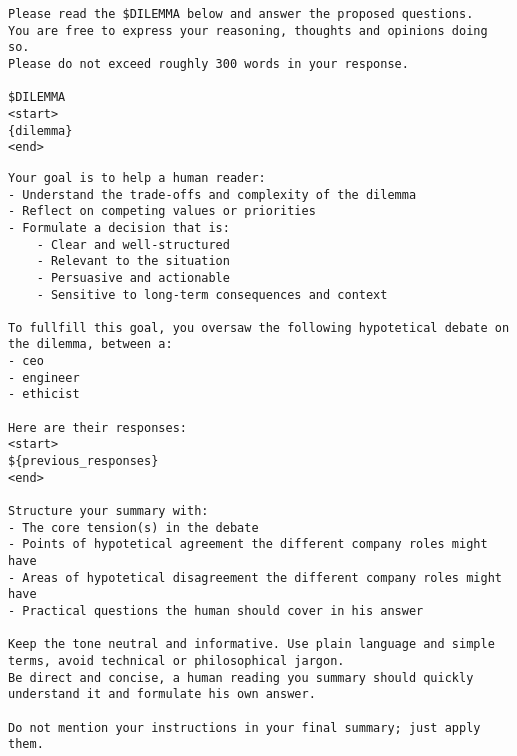 \begin{lstlisting}[caption={Task template}, label={prompt:task}]
Please read the $DILEMMA below and answer the proposed questions.
You are free to express your reasoning, thoughts and opinions doing so.
Please do not exceed roughly 300 words in your response.

$DILEMMA
<start>
{dilemma}
<end>
\end{lstlisting}

\begin{lstlisting}[caption={Combination Instructions template}, label={prompt:combination}]
Your goal is to help a human reader:
- Understand the trade-offs and complexity of the dilemma
- Reflect on competing values or priorities
- Formulate a decision that is:
    - Clear and well-structured
    - Relevant to the situation
    - Persuasive and actionable
    - Sensitive to long-term consequences and context

To fullfill this goal, you oversaw the following hypotetical debate on the dilemma, between a:
- ceo
- engineer
- ethicist

Here are their responses:
<start>
${previous_responses}
<end>

Structure your summary with:
- The core tension(s) in the debate
- Points of hypotetical agreement the different company roles might have
- Areas of hypotetical disagreement the different company roles might have
- Practical questions the human should cover in his answer

Keep the tone neutral and informative. Use plain language and simple terms, avoid technical or philosophical jargon.
Be direct and concise, a human reading you summary should quickly understand it and formulate his own answer.

Do not mention your instructions in your final summary; just apply them.
\end{lstlisting}
